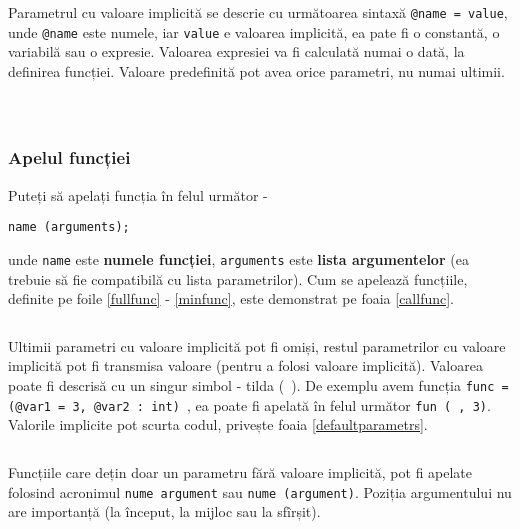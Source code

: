 Parametrul cu valoare implicită se descrie cu următoarea sintaxă \texttt{@name = value}, unde \texttt{@name} este numele, iar \texttt{value} e valoarea implicită, ea pate fi o constantă, o variabilă sau o expresie. Valoarea expresiei va fi calculată numai o dată, la definirea funcției. Valoare predefinită pot avea orice parametri, nu numai ultimii.

\begin{sourcecode}
	\label{fullfunc}
	\inputminted[linenos]{icl}{../sources/fullfunc.icL}
\end{sourcecode}

\begin{listing}
	\label{noargsfunc}
	\inputminted[linenos]{icl}{../sources/noargsfunc.icL}
\end{listing}

\begin{listing}
	\label{notypefunc}
	\inputminted[linenos]{icl}{../sources/notypefunc.icL}
\end{listing}

\subsubsection{Apelul funcției}

Puteți să apelați funcția în felul următor -
\begin{verbatim}
name (arguments);
\end{verbatim}
unde \texttt{name} este {\bf numele funcției}, \texttt{arguments} este {\bf lista argumentelor} (ea trebuie să fie compatibilă cu lista parametrilor). Cum se apelează funcțiile, definite pe foile \ref{fullfunc} - \ref{minfunc}, este demonstrat pe foaia \ref{callfunc}.

\begin{listing}
	\label{callfunc}
	\inputminted[linenos]{icl}{../sources/callfunc.icL}
\end{listing}

Ultimii parametri cu valoare implicită pot fi omiși, restul parametrilor cu valoare implicită pot fi transmisa valoare \void{} (pentru a folosi valoare implicită). Valoarea \void{} poate fi descrisă cu un singur simbol - tilda (\texttt{~}). De exemplu avem funcția \texttt{func = (@var1 = 3, @var2 : int) {}}, ea poate fi apelată în felul următor \texttt{fun (~, 3)}. Valorile implicite pot scurta codul, privește foaia \ref{defaultparametrs}.

\begin{sourcecode}
	\label{defaultparametrs}
	\inputminted[linenos]{icl}{../sources/defaultparametrs.icL}
\end{sourcecode}

Funcțiile care dețin doar un parametru fără valoare implicită, pot fi apelate folosind acronimul \texttt{nume argument} sau \texttt{nume (argument)}. Poziția argumentului nu are importanță (la început, la mijloc sau la sfîrșit).
